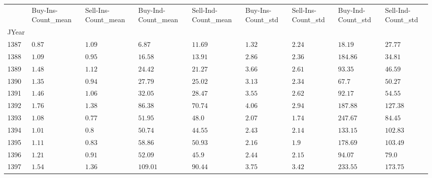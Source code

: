 \begin{tabular}{lllllllll}
\toprule
 & Buy-Ins-Count_mean & Sell-Ins-Count_mean & Buy-Ind-Count_mean & Sell-Ind-Count_mean & Buy-Ins-Count_std & Sell-Ins-Count_std & Buy-Ind-Count_std & Sell-Ind-Count_std \\
JYear &  &  &  &  &  &  &  &  \\
\midrule
1387 & \(\mathrm{0.87}\) & \(\mathrm{1.09}\) & \(\mathrm{6.87}\) & \(\mathrm{11.69}\) & \(\mathrm{1.32}\) & \(\mathrm{2.24}\) & \(\mathrm{18.19}\) & \(\mathrm{27.77}\) \\
1388 & \(\mathrm{1.09}\) & \(\mathrm{0.95}\) & \(\mathrm{16.58}\) & \(\mathrm{13.91}\) & \(\mathrm{2.86}\) & \(\mathrm{2.36}\) & \(\mathrm{184.86}\) & \(\mathrm{34.81}\) \\
1389 & \(\mathrm{1.48}\) & \(\mathrm{1.12}\) & \(\mathrm{24.42}\) & \(\mathrm{21.27}\) & \(\mathrm{3.66}\) & \(\mathrm{2.61}\) & \(\mathrm{93.35}\) & \(\mathrm{46.59}\) \\
1390 & \(\mathrm{1.35}\) & \(\mathrm{0.94}\) & \(\mathrm{27.79}\) & \(\mathrm{25.02}\) & \(\mathrm{3.13}\) & \(\mathrm{2.34}\) & \(\mathrm{67.7}\) & \(\mathrm{50.27}\) \\
1391 & \(\mathrm{1.46}\) & \(\mathrm{1.06}\) & \(\mathrm{32.05}\) & \(\mathrm{28.47}\) & \(\mathrm{3.55}\) & \(\mathrm{2.62}\) & \(\mathrm{92.17}\) & \(\mathrm{54.55}\) \\
1392 & \(\mathrm{1.76}\) & \(\mathrm{1.38}\) & \(\mathrm{86.38}\) & \(\mathrm{70.74}\) & \(\mathrm{4.06}\) & \(\mathrm{2.94}\) & \(\mathrm{187.88}\) & \(\mathrm{127.38}\) \\
1393 & \(\mathrm{1.08}\) & \(\mathrm{0.77}\) & \(\mathrm{51.95}\) & \(\mathrm{48.0}\) & \(\mathrm{2.07}\) & \(\mathrm{1.74}\) & \(\mathrm{247.67}\) & \(\mathrm{84.45}\) \\
1394 & \(\mathrm{1.01}\) & \(\mathrm{0.8}\) & \(\mathrm{50.74}\) & \(\mathrm{44.55}\) & \(\mathrm{2.43}\) & \(\mathrm{2.14}\) & \(\mathrm{133.15}\) & \(\mathrm{102.83}\) \\
1395 & \(\mathrm{1.11}\) & \(\mathrm{0.83}\) & \(\mathrm{58.86}\) & \(\mathrm{50.93}\) & \(\mathrm{2.16}\) & \(\mathrm{1.9}\) & \(\mathrm{178.69}\) & \(\mathrm{103.49}\) \\
1396 & \(\mathrm{1.21}\) & \(\mathrm{0.91}\) & \(\mathrm{52.09}\) & \(\mathrm{45.9}\) & \(\mathrm{2.44}\) & \(\mathrm{2.15}\) & \(\mathrm{94.07}\) & \(\mathrm{79.0}\) \\
1397 & \(\mathrm{1.54}\) & \(\mathrm{1.36}\) & \(\mathrm{109.01}\) & \(\mathrm{90.44}\) & \(\mathrm{3.75}\) & \(\mathrm{3.42}\) & \(\mathrm{233.55}\) & \(\mathrm{173.75}\) \\

\end{tabular}
